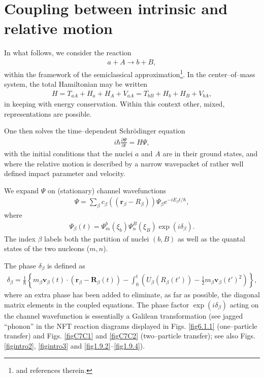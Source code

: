 \section{Coupling between intrinsic and relative motion}\label{appintroB}
In what follows, we consider the reaction
\begin{align}
a+A\rightarrow b+B,
\end{align}
within the framework of the semiclassical approximation\footnote{\cite{Broglia:04a} and references therein.}.
In the center--of--mass system, the total Hamiltonian may be written
\begin{align}\label{eqintroB2}
H=T_{aA}+H_a+H_A+V_{aA}=T_{bB}+H_b+H_B+V_{bA},
\end{align}
in keeping with energy conservation. Within this context other, mixed, representations are possible.

One then solves the time--dependent Schr\"odinger equation 
\begin{align}
i\hbar\frac{\partial \Psi}{\partial t}=H\Psi,
\end{align}
with the initial conditions that the nuclei $a$ and $A$ are in their ground states, and where the relative motion is described by a narrow wavepacket of rather well defined impact parameter and velocity.


We expand $\Psi$ on (stationary) channel wavefunctions 
\begin{align}
\Psi=\sum_{\beta}c_\beta\left(\left(\mathbf r_\beta-R_\beta\right)\right)\Psi_\beta e^{-iE_\beta t/\hbar},
\end{align}
where
\begin{align}
\Psi_\beta (t)=\Psi_m^b(\xi_b)\Psi_n^B(\xi_B)\exp(i\delta_\beta).
\end{align}
The index $\beta$ labels both the partition of nuclei $(b,B)$ as well as the quantal states of the two nucleons ($m,n$).


The phase $\delta_\beta$ is defined as
\begin{align}
\delta_\beta=\frac{1}{\hbar}\left\{m_\beta \mathbf v_\beta(t)\cdot \left(\mathbf r_\beta-\mathbf R_\beta(t)\right)-\int_0^t\left(U_\beta\left(R_\beta(t')\right)-\frac{1}{2}m_\beta\mathbf v_\beta(t')^2\right)\right\},
\end{align}
 where an extra phase has been added to eliminate, as far as possible, the diagonal matrix elements in the coupled equations.
The phase factor $\exp(i\delta_\beta)$ acting on the channel wavefunction is essentially a Galilean transformation (see jagged ``phonon'' in the NFT reaction diagrams displayed in Figs. \ref{fig6.1.1} (one--particle transfer) and Figs. \ref{figC7C1} and \ref{figC7C2} (two--particle transfer); see also Figs. \ref{figintro2}, \ref{figintro3} and \ref{fig1.9.2}--\ref{fig1.9.4}).



